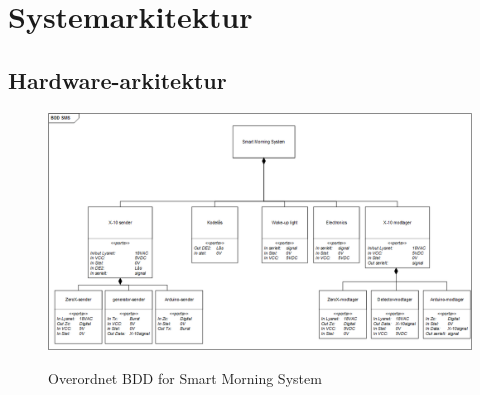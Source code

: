 \documentclass[11pt]{article}
\begin{document}
\section{Systemarkitektur}
\subsection{Hardware-arkitektur}


\begin{figure}[H]
\centering
\includegraphics[scale=0.6]{Bdd-sms.png}
\label{FIG: Full BDD}
\caption{Overordnet BDD for Smart Morning System}
\end{figure}
\end{document}
